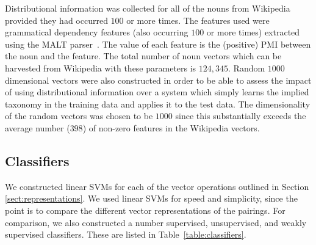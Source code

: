 \documentclass[11pt]{article}
\begin{document}



Distributional information was collected for all of the nouns from Wikipedia provided they had occurred $100$ or more times.  The features used were grammatical dependency features (also occurring $100$ or more times) extracted using the MALT parser~\cite{Nivre2006}.  The value of each feature is the (positive) PMI between the noun and the feature. The total number of noun vectors which can be harvested from Wikipedia with these parameters is $124,345$.  Random $1000$ dimensional vectors were also constructed in order to be able to assess the impact of using distributional information over a system which simply learns the implied taxonomy in the training data and applies it to the test data.  The dimensionality of the random vectors was chosen to be $1000$ since this substantially exceeds the average number ($398$) of non-zero features in the Wikipedia vectors.

\subsection{Classifiers}

We constructed linear SVMs for each of the vector operations outlined in Section \ref{sect:representations}.  We used linear SVMs for speed and simplicity, since the point is to compare the different vector representations of the pairings.  For comparison, we also constructed a number supervised, unsupervised, and  weakly supervised classifiers. These are listed in Table~\ref{table:classifiers}.  
\end{document}
